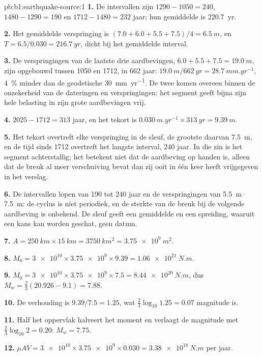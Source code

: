 \begin{solution}{pb:b1:earthquake-source:1}
\textbf{1.} De intervallen zijn $1290 - 1050 = 240$, $1480 - 1290 = 190$ en
$1712 - 1480 = 232$ jaar; hun gemiddelde is \qty{220.7}{yr}.

\textbf{2.} Het gemiddelde verspringing is $(7.0 + 6.0 + 5.5 + 7.5)/4 = \qty{6.5}{m}$, en
$T = 6.5/0.030 = \qty{216.7}{yr}$, dicht bij het gemiddelde interval.

\textbf{3.} De verspringingen van de laatste drie aardbevingen, $6.0 + 5.5 + 7.5 =
\qty{19.0}{m}$, zijn opgebouwd tussen 1050 en 1712, in 662 jaar: $\qty{19.0}{m}
/\qty{662}{yr} = \qty{28.7}{mm.yr^{-1}}$, \qty{4}{\percent} minder dan de
geodetische \qty{30}{mm.yr^{-1}}. De twee komen overeen binnen de onzekerheid van de
dateringen en verspringingen: het segment geeft bijna zijn hele belasting in zijn grote
aardbevingen vrij.

\textbf{4.} $2025 - 1712 = 313$ jaar, en het tekort is
$\qty{0.030}{m.yr^{-1}}\times\qty{313}{yr} = \qty{9.39}{m}$.

\textbf{5.} Het tekort overtreft elke verspringing in de sleuf, de grootste daarvan
\qty{7.5}{m}, en de tijd sinds 1712 overtreft het langste interval, 240 jaar. In die zin
is het segment achterstallig; het betekent niet dat de aardbeving op handen is, alleen dat
de breuk al meer verschuiving bevat dan zij ooit in één keer heeft vrijgegeven in het
verslag.

\textbf{6.} De intervallen lopen van 190 tot 240 jaar en de verspringingen van
\qtyrange{5.5}{7.5}{m}: de cyclus is niet periodiek, en de sterkte van de breuk bij de
volgende aardbeving is onbekend. De sleuf geeft een gemiddelde en een spreiding, waaruit
een kans kan worden geschat, geen datum.

\textbf{7.} $A = \qty{250}{km}\times\qty{15}{km} = \qty{3750}{km^2} =
\qty{3.75e9}{m^2}$.

\textbf{8.} $M_0 = \num{3e10}\times\num{3.75e9}\times\num{9.39} =
\qty{1.06e21}{N.m}$.

\textbf{9.} $M_0 = \num{3e10}\times\num{3.75e9}\times\num{7.5} =
\qty{8.44e20}{N.m}$, dus $M_w = \tfrac23(20.926 - 9.1) = 7.88$.

\textbf{10.} De verhouding is $9.39/7.5 = 1.25$, wat $\tfrac23\log_{10}1.25 =
0.07$ magnitude is.

\textbf{11.} Half het oppervlak halveert het moment en verlaagt de magnitude met
$\tfrac23\log_{10}2 = 0.20$: $M_w = 7.75$.

\textbf{12.} $\mu A V = \num{3e10}\times\num{3.75e9}\times\num{0.030} =
\qty{3.38e18}{N.m}$ per jaar.


\end{solution}
